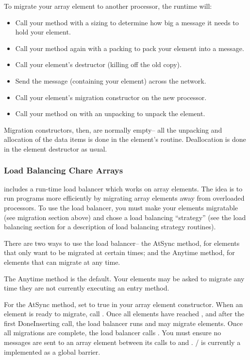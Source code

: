 To migrate your array element to another processor, the \charmpp{}
runtime will:

\begin{itemize}
\item Call your  method with a sizing  to determine how 
big a message it needs to hold your element.
\item Call your  method again with a packing  to pack 
your element into a message.
\item Call your element's destructor (killing off the old copy).
\item Send the message (containing your element) across the network.
\item Call your element's migration constructor on the new processor.
\item Call your  method on with an unpacking  to unpack 
the element.
\end{itemize}

Migration constructors, then, are normally empty-- all the unpacking
and allocation of the data items is done in the element's  routine.
Deallocation is done in the element destructor as usual.


\subsubsection{Load Balancing Chare Arrays}
\charmpp{} includes a run-time load balancer which works
on array elements.  The idea is to run programs more efficiently
by migrating array elements away from overloaded processors.
To use the load balancer, you must make your elements migratable
(see migration section above) and chose a load balancing 
``strategy'' (see the load balancing section for a description
of load balancing strategy routines).

There are two ways to use the load balancer-- the AtSync
method, for elements that only want to be migrated at certain
times; and the Anytime method, for elements that can migrate
at any time.

The Anytime method is the default.  Your elements may be
asked to migrate any time they are not currently executing
an entry method.

For the AtSync method, set  to true in your 
array element constructor.  When an element is ready to migrate,
call .  Once all elements have reached , 
and after the first DoneInserting call,
the load balancer runs and may migrate elements.  Once
all migrations are complete, the load balancer calls 
.  You must ensure no messages are
sent to an array element between its calls to  and
. / is currently
a implemented as a global barrier.



